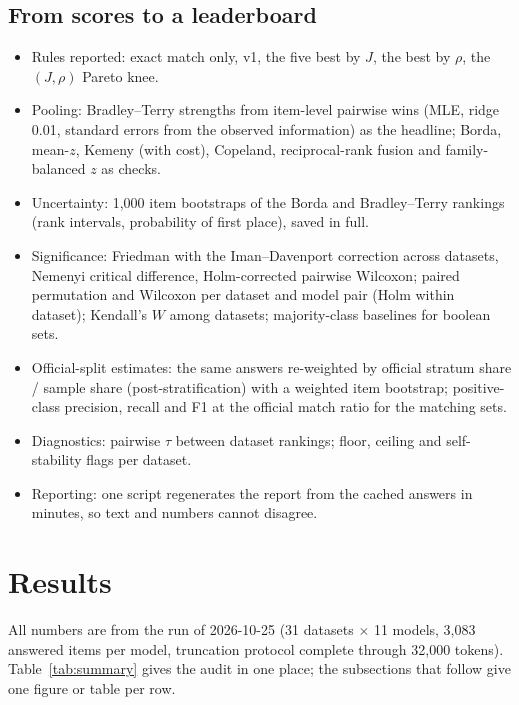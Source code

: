 \documentclass[11pt]{article}
\begin{document}
\subsection{From scores to a leaderboard}
\label{sec:setup:official}
\begin{itemize}
\item Rules reported: exact match only, v1, the five best by $J$, the best by $\rho$, the $(J,\rho)$ Pareto knee.
\item Pooling: Bradley--Terry strengths from item-level pairwise wins (MLE, ridge 0.01, standard errors from the observed information) as the headline; Borda, mean-$z$, Kemeny (with cost), Copeland, reciprocal-rank fusion and family-balanced $z$ as checks.
\item Uncertainty: 1,000 item bootstraps of the Borda and Bradley--Terry rankings (rank intervals, probability of first place), saved in full.
\item Significance: Friedman with the Iman--Davenport correction across datasets, Nemenyi critical difference, Holm-corrected pairwise Wilcoxon; paired permutation and Wilcoxon per dataset and model pair (Holm within dataset); Kendall's $W$ among datasets; majority-class baselines for boolean sets.
\item Official-split estimates: the same answers re-weighted by official stratum share / sample share (post-stratification) with a weighted item bootstrap; positive-class precision, recall and F1 at the official match ratio for the matching sets.
\item Diagnostics: pairwise $\tau$ between dataset rankings; floor, ceiling and self-stability flags per dataset.
\item Reporting: one script regenerates the report from the cached answers in minutes, so text and numbers cannot disagree.
\end{itemize}

\section{Results}
\label{sec:results}

All numbers are from the run of 2026-10-25 (31 datasets $\times$ 11 models, 3,083 answered items per model, truncation protocol complete through 32,000 tokens). Table~\ref{tab:summary} gives the audit in one place; the subsections that follow give one figure or table per row.
\end{document}
